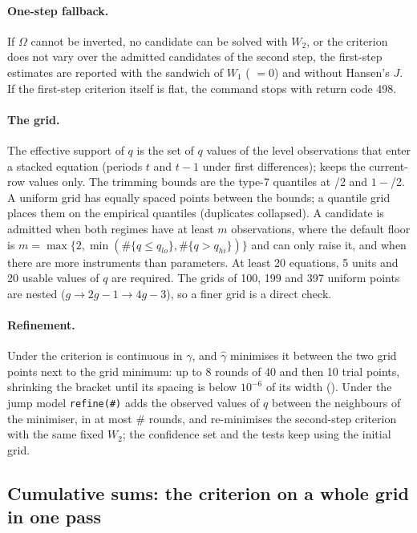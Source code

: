 \paragraph{One-step fallback.} If $\Omega$ cannot be inverted, no candidate can be solved with $W_2$,
or the criterion does not vary over the admitted candidates of the second step, the first-step
estimates are reported with the sandwich of $W_1$ ( $=0$) and without
Hansen's $J$. If the first-step criterion itself is flat, the command stops with return code 498.

\paragraph{The grid.} The effective support of $q$ is the set of $q$ values of the level observations
that enter a stacked equation (periods $t$ and $t-1$ under first differences); 
keeps the current-row values only. The trimming bounds are the type-7 quantiles at
/2 and $1-$/2. A uniform grid has equally spaced points between the bounds;
a quantile grid places them on the empirical quantiles (duplicates collapsed). A candidate is
admitted when both regimes have at least $m$ observations, where the default floor is
$m=\max\{2,\min(\#\{q\le q_{lo}\},\#\{q>q_{hi}\})\}$ and  can only raise it, and when
there are more instruments than parameters. At least 20 equations, 5 units and 20 usable values of
$q$ are required. The grids of 100, 199 and 397 uniform points are nested ($g\to2g-1\to4g-3$), so
a finer grid is a direct check.

\paragraph{Refinement.} Under  the criterion is continuous in $\gamma$, and $\hat\gamma$
minimises it between the two grid points next to the grid minimum: up to 8 rounds of 40 and then 10
trial points, shrinking the bracket until its spacing is below $10^{-6}$ of its width
(). Under the jump model \texttt{refine(\#)} adds the observed values of $q$
between the neighbours of the minimiser, in at most \# rounds, and re-minimises the second-step
criterion with the same fixed $W_2$; the confidence set and the tests keep using the initial grid.

\subsection{Cumulative sums: the criterion on a whole grid in one pass}\label{note:cumsum}

